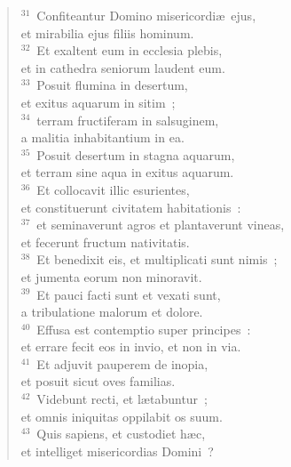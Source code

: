 \begin{flushleft}
\begin{verse}
${}^{31}$~Confiteantur Domino misericordi\ae\ ejus,\\ et mirabilia ejus filiis hominum.\\
${}^{32}$~Et exaltent eum in ecclesia plebis,\\ et in cathedra seniorum laudent eum.\\
${}^{33}$~Posuit flumina in desertum,\\ et exitus aquarum in sitim~;\\
${}^{34}$~terram fructiferam in salsuginem,\\ a malitia inhabitantium in ea.\\
${}^{35}$~Posuit desertum in stagna aquarum,\\ et terram sine aqua in exitus aquarum.\\
${}^{36}$~Et collocavit illic esurientes,\\ et constituerunt civitatem habitationis~:\\
${}^{37}$~et seminaverunt agros et plantaverunt vineas,\\ et fecerunt fructum nativitatis.\\
${}^{38}$~Et benedixit eis, et multiplicati sunt nimis~;\\ et jumenta eorum non minoravit.\\
${}^{39}$~Et pauci facti sunt et vexati sunt,\\ a tribulatione malorum et dolore.\\
${}^{40}$~Effusa est contemptio super principes~:\\ et errare fecit eos in invio, et non in via.\\
${}^{41}$~Et adjuvit pauperem de inopia,\\ et posuit sicut oves familias.\\
${}^{42}$~Videbunt recti, et l\ae tabuntur~;\\ et omnis iniquitas oppilabit os suum.\\
${}^{43}$~Quis sapiens, et custodiet h\ae c,\\ et intelliget misericordias Domini~?\end{verse}\end{flushleft}


